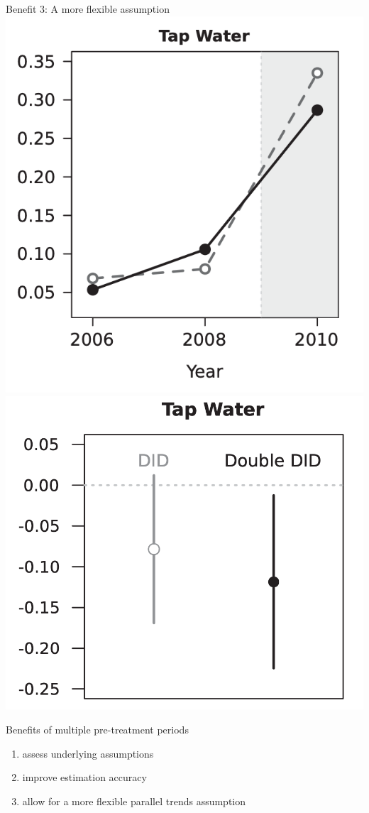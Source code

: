 \documentclass{beamer}
\begin{document}
\begin{frame}{Benefit 3: A more flexible assumption}
\includegraphics[width = .4\textwidth]{figures/ey_fig3b} \qquad
\includegraphics[width = .4\textwidth]{figures/ey_fig4b}
\end{frame}

\begin{frame}{Benefits of multiple pre-treatment periods}

\begin{enumerate}
\item assess underlying assumptions
\item improve estimation accuracy
\item allow for a more flexible parallel trends assumption
\end{enumerate}
\end{frame}
\end{document}
